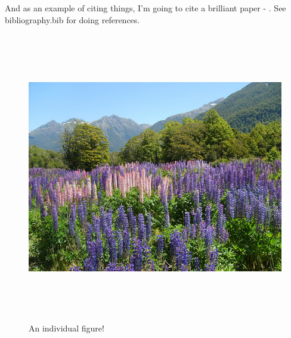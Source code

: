 And as an example of citing things, I'm going to cite a brilliant paper - \citep{jones_2016}. See bibliography.bib for doing references.

\begin{figure}
	\includegraphics[height =5in]{./Plots/nature.jpg}
	\caption{An individual figure!}
\end{figure}

